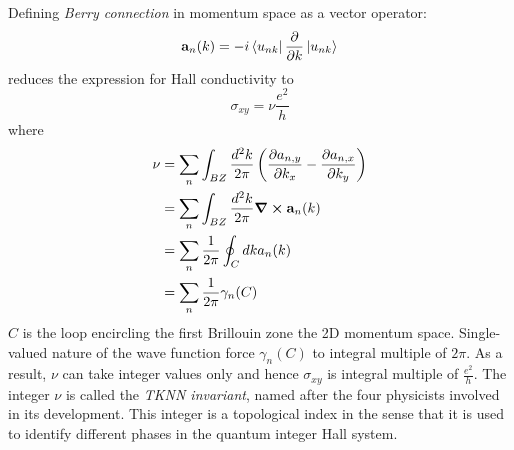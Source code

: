 Defining \textit{Berry connection} in momentum space as a vector operator:
\begin{equation}
    \mathbf{a}_n(k) = -i\bra{u_{nk}}\dfrac{\partial}{\partial k}\ket{u_{nk}}
\end{equation}
reduces the expression for Hall conductivity to 
\begin{equation}
    \sigma _{xy} = \nu \frac{e^2}{h}
\end{equation}
where
\begin{equation}
    \begin{split}
        \nu &= \sum^{}_{n} \int _{BZ} \frac{d^2k}{2\pi} \left( \dfrac{\partial a_{n,y}}{\partial k_x} - \dfrac{\partial a_{n,x}}{\partial k_y} \right)\\
        &= \sum^{}_{n} \int _{BZ} \frac{d^2k}{2\pi} \grad \cross \mathbf{a}_n(k)\\
        &= \sum^{}_{n}\frac{1}{2\pi} \oint _C dk a_n(k)\\
        &= \sum^{}_{n} \frac{1}{2\pi} \gamma _n(C)
    \end{split}
\end{equation}
$C$ is the loop encircling the first Brillouin zone the 2D momentum space. Single-valued nature of the wave function force $\gamma _n(C)$ to integral multiple of $2\pi$. As a result, $\nu$ can take integer values only and hence $\sigma _{xy}$ is integral multiple of $\frac{e^2}{h}$. The integer $\nu$ is called the \textit{TKNN invariant}, named after the four physicists involved in its development. This integer is a topological index in the sense that it is used to identify different phases in the quantum integer Hall system.

